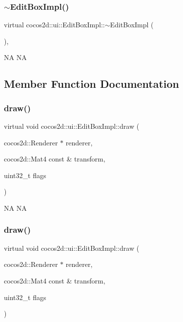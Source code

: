 \subsubsection{\texorpdfstring{$\sim$\+Edit\+Box\+Impl()}{~EditBoxImpl()}\hspace{0.1cm}{\footnotesize\ttfamily [2/2]}}
{\footnotesize\ttfamily virtual cocos2d\+::ui\+::\+Edit\+Box\+Impl\+::$\sim$\+Edit\+Box\+Impl (\begin{DoxyParamCaption}{ }\end{DoxyParamCaption})\hspace{0.3cm}{\ttfamily [inline]}, {\ttfamily [virtual]}}

NA  NA 

\subsection{Member Function Documentation}
\mbox{\label{classcocos2d_1_1ui_1_1EditBoxImpl_ada62d5295e06cf1be160490b89e8ac67}} 
\subsubsection{\texorpdfstring{draw()}{draw()}\hspace{0.1cm}{\footnotesize\ttfamily [1/2]}}
{\footnotesize\ttfamily virtual void cocos2d\+::ui\+::\+Edit\+Box\+Impl\+::draw (\begin{DoxyParamCaption}\item[{cocos2d\+::\+Renderer $\ast$}]{renderer,  }\item[{cocos2d\+::\+Mat4 const \&}]{transform,  }\item[{uint32\+\_\+t}]{flags }\end{DoxyParamCaption})\hspace{0.3cm}{\ttfamily [pure virtual]}}

NA  NA \mbox{\label{classcocos2d_1_1ui_1_1EditBoxImpl_ada62d5295e06cf1be160490b89e8ac67}} 
\subsubsection{\texorpdfstring{draw()}{draw()}\hspace{0.1cm}{\footnotesize\ttfamily [2/2]}}
{\footnotesize\ttfamily virtual void cocos2d\+::ui\+::\+Edit\+Box\+Impl\+::draw (\begin{DoxyParamCaption}\item[{cocos2d\+::\+Renderer $\ast$}]{renderer,  }\item[{cocos2d\+::\+Mat4 const \&}]{transform,  }\item[{uint32\+\_\+t}]{flags }\end{DoxyParamCaption})\hspace{0.3cm}{\ttfamily [pure virtual]}}

